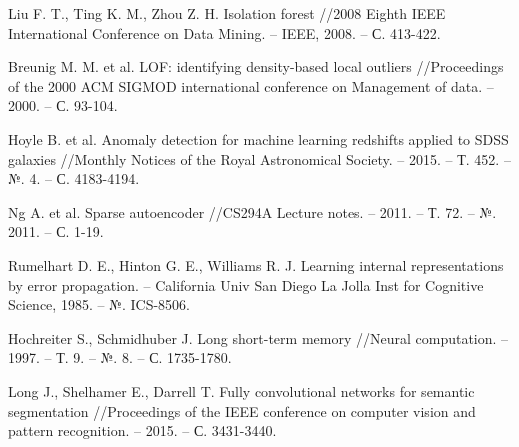 \documentclass[12pt]{article}
\begin{document}
\begin{thebibliography}{20}
        Liu F. T., Ting K. M., Zhou Z. H. Isolation forest //2008 Eighth IEEE International Conference on Data Mining. – IEEE, 2008. – С. 413-422.



        Breunig M. M. et al. LOF: identifying density-based local outliers //Proceedings of the 2000 ACM SIGMOD international conference on Management of data. – 2000. – С. 93-104.


        Hoyle B. et al. Anomaly detection for machine learning redshifts applied to SDSS galaxies //Monthly Notices of the Royal Astronomical Society. – 2015. – Т. 452. – №. 4. – С. 4183-4194.

        Ng A. et al. Sparse autoencoder //CS294A Lecture notes. – 2011. – Т. 72. – №. 2011. – С. 1-19.

        Rumelhart D. E., Hinton G. E., Williams R. J. Learning internal representations by error propagation. – California Univ San Diego La Jolla Inst for Cognitive Science, 1985. – №. ICS-8506.

        Hochreiter S., Schmidhuber J. Long short-term memory //Neural computation. – 1997. – Т. 9. – №. 8. – С. 1735-1780.


        Long J., Shelhamer E., Darrell T. Fully convolutional networks for semantic segmentation //Proceedings of the IEEE conference on computer vision and pattern recognition. – 2015. – С. 3431-3440.

    \end{thebibliography}
\end{document}
